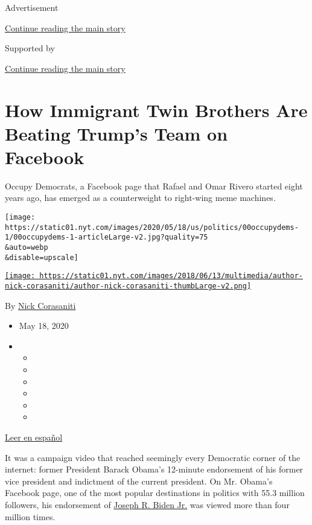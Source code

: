 Advertisement

\protect\hyperlink{after-top}{Continue reading the main story}

Supported by

\protect\hyperlink{after-sponsor}{Continue reading the main story}

\hypertarget{how-immigrant-twin-brothers-are-beating-trumps-team-on-facebook}{%
\section{How Immigrant Twin Brothers Are Beating Trump's Team on
Facebook}\label{how-immigrant-twin-brothers-are-beating-trumps-team-on-facebook}}

Occupy Democrats, a Facebook page that Rafael and Omar Rivero started
eight years ago, has emerged as a counterweight to right-wing meme
machines.

\texttt{[image: https://static01.nyt.com/images/2020/05/18/us/politics/00occupydems-1/00occupydems-1-articleLarge-v2.jpg?quality=75\\\&auto=webp\\\&disable=upscale]}

\href{https://www.nytimes.com/by/nick-corasaniti}{\texttt{[image: https://static01.nyt.com/images/2018/06/13/multimedia/author-nick-corasaniti/author-nick-corasaniti-thumbLarge-v2.png]}}

By \href{https://www.nytimes.com/by/nick-corasaniti}{Nick Corasaniti}

\begin{itemize}
\item
  May 18, 2020
\item
  \begin{itemize}
  \item
  \item
  \item
  \item
  \item
  \item
  \end{itemize}
\end{itemize}

\href{https://www.nytimes.com/es/2020/05/21/espanol/occupy-democrats-facebook-trump.html}{Leer
en español}

It was a campaign video that reached seemingly every Democratic corner
of the internet: former President Barack Obama's 12-minute endorsement
of his former vice president and indictment of the current president. On
Mr. Obama's Facebook page, one of the most popular destinations in
politics with 55.3 million followers, his endorsement of
\href{https://www.nytimes.com/interactive/2020/us/elections/joe-biden.html}{Joseph
R. Biden Jr.} was viewed more than four million times.

